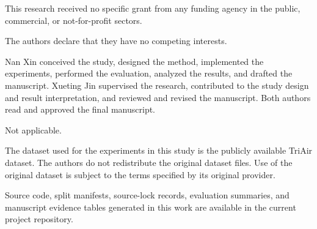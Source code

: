 \documentclass[pdflatex,iicol,sn-mathphys-num]{sn-jnl}
\begin{document}
This research received no specific grant from any funding agency in the public, commercial, or not-for-profit sectors.

The authors declare that they have no competing interests.

Nan Xin conceived the study, designed the method, implemented the experiments, performed the evaluation, analyzed the results, and drafted the manuscript. Xueting Jin supervised the research, contributed to the study design and result interpretation, and reviewed and revised the manuscript. Both authors read and approved the final manuscript.

Not applicable.

The dataset used for the experiments in this study is the publicly available TriAir dataset. The authors do not redistribute the original dataset files. Use of the original dataset is subject to the terms specified by its original provider.

Source code, split manifests, source-lock records, evaluation summaries, and manuscript evidence tables generated in this work are available in the current project repository.


\end{document}
